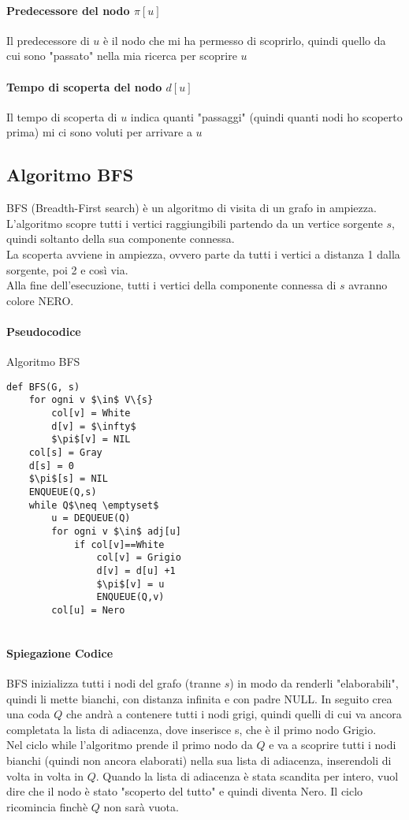 \documentclass[12pt, a4paper, openany]{book}
\begin{document}
\paragraph{Predecessore del nodo $\pi[u]$}
Il predecessore di $u$ è il nodo che mi ha permesso di scoprirlo, quindi quello da cui sono "passato" nella mia ricerca per scoprire $u$
\paragraph{Tempo di scoperta del nodo $d[u]$}
Il tempo di scoperta di $u$ indica quanti "passaggi" (quindi quanti nodi ho scoperto prima) mi ci sono voluti per arrivare a $u$

\subsection{Algoritmo BFS}
BFS (Breadth-First search) è un algoritmo di visita di un grafo in ampiezza.
\\L'algoritmo scopre tutti i vertici raggiungibili partendo da un vertice sorgente $s$, quindi soltanto della sua componente connessa.
\\La scoperta avviene in ampiezza, ovvero parte da tutti i vertici a distanza 1 dalla sorgente, poi 2 e così via.
\\Alla fine dell'esecuzione, tutti i vertici della componente connessa di $s$ avranno colore NERO.

\paragraph{Pseudocodice} Algoritmo BFS
\begin{lstlisting}
def BFS(G, s)
    for ogni v $\in$ V\{s}
        col[v] = White
        d[v] = $\infty$
        $\pi$[v] = NIL
    col[s] = Gray
    d[s] = 0
    $\pi$[s] = NIL
    ENQUEUE(Q,s)
    while Q$\neq \emptyset$
        u = DEQUEUE(Q)
        for ogni v $\in$ adj[u]
            if col[v]==White
                col[v] = Grigio
                d[v] = d[u] +1
                $\pi$[v] = u
                ENQUEUE(Q,v)
        col[u] = Nero
    
\end{lstlisting}
\paragraph{Spiegazione Codice}
BFS inizializza tutti i nodi del grafo (tranne $s$) in modo da renderli "elaborabili", quindi li mette bianchi, con distanza infinita e con padre NULL.
In seguito crea una coda $Q$ che andrà a contenere tutti i nodi grigi, quindi quelli di cui va ancora completata la lista di adiacenza,
dove inserisce s, che è il primo nodo Grigio.
\\Nel ciclo while l'algoritmo prende il primo nodo da $Q$ e va a scoprire tutti i nodi bianchi (quindi non ancora elaborati) nella sua lista di adiacenza, inserendoli di volta in volta in $Q$.
Quando la lista di adiacenza è stata scandita per intero, vuol dire che il nodo è stato "scoperto del tutto" e quindi diventa Nero.
Il ciclo ricomincia finchè $Q$ non sarà vuota.
\end{document}

